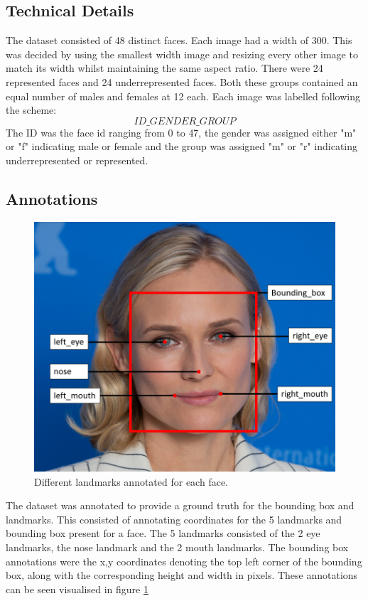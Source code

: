 \documentclass{l4proj}
\begin{document}
\subsection{Technical Details}
The dataset consisted of 48 distinct faces. Each image had a width of 300. This was decided by using the smallest width image and resizing every other image to match its width whilst maintaining the same aspect ratio. There were 24 represented faces and 24 underrepresented faces. Both these groups contained an equal number of males and females at 12 each. Each image was labelled following the scheme: \[ ID\_GENDER\_GROUP \] The ID was the face id ranging from 0 to 47, the gender was assigned either "m" or "f" indicating male or female and the group was assigned "m" or "r" indicating underrepresented or represented. 

\subsection{Annotations}
\begin{figure}[h!]
  \centering
  \begin{minipage}{0.8\textwidth}
    \includegraphics[width=\textwidth]{images/example_bb_better.PNG}
    \caption{Different landmarks annotated for each face.}
    \label{example_bb}
  \end{minipage}
  \hfill
\end{figure}
The dataset was annotated to provide a ground truth for the bounding box and landmarks. This consisted of annotating coordinates for the 5 landmarks and bounding box present for a face. The 5 landmarks consisted of the 2 eye landmarks, the nose landmark and the 2 mouth landmarks. The bounding box annotations were the x,y coordinates denoting the top left corner of the bounding box, along with the corresponding height and width in pixels. These annotations can be seen visualised in figure \ref{example_bb}
\end{document}
